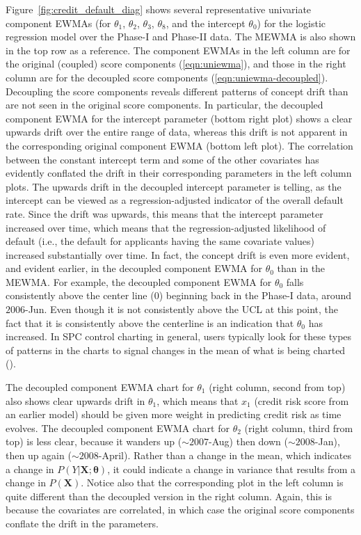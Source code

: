 \documentclass[twoside,11pt]{article}
\begin{document}
Figure~\ref{fig:credit_default_diag} shows several representative univariate component EWMAs (for $\theta_1$, $\theta_2$, $\theta_3$, $\theta_8$, and the intercept $\theta_0$) for the logistic regression model over the Phase-I and Phase-II data. The MEWMA is also shown in the top row as a reference. The component EWMAs in the left column are for the original (coupled) score components (\ref{eqn:uniewma}), and those in the right column are for the decoupled score components (\ref{eqn:uniewma-decoupled}). Decoupling the score components reveals different patterns of concept drift than are not seen in the original score components. In particular, the decoupled component EWMA for the intercept parameter (bottom right plot) shows a clear upwards drift over the entire range of data, whereas this drift is not apparent in the corresponding original component EWMA (bottom left plot). The correlation between the constant intercept term and some of the other covariates has evidently conflated the drift in their corresponding parameters in the left column plots. The upwards drift in the decoupled intercept parameter is telling, as the intercept can be viewed as a regression-adjusted indicator of the overall default rate. Since the drift was upwards, this means that the intercept parameter increased over time, which means that the regression-adjusted likelihood of default (i.e., the default for applicants having the same covariate values) increased substantially over time. In fact, the concept drift is even more evident, and evident earlier, in the decoupled component EWMA for $\theta_0$ than in the MEWMA. For example, the decoupled component EWMA for $\theta_0$ falls consistently above the center line ($0$) beginning back in the Phase-I data, around $2006$-Jun. Even though it is not consistently above the UCL at this point, the fact that it is consistently above the centerline is an indication that $\theta_0$ has increased. In SPC control charting in general, users typically look for these types of patterns in the charts to signal changes in the mean of what is being charted (\cite{montgomery2007introduction}). 

The decoupled component EWMA chart for $\theta_1$ (right column, second from top) also shows clear upwards drift in $\theta_1$, which means that $x_1$ (credit risk score from an earlier model) should be given more weight in predicting credit risk as time evolves. The decoupled component EWMA chart for $\theta_2$ (right column, third from top) is less clear, because it wanders up ($\sim 2007$-Aug) then down ($\sim 2008$-Jan), then up again ($\sim 2008$-April). Rather than a change in the mean, which indicates a change in $P(Y|\bm{X};\bm{\theta})$, it could indicate a change in variance that results from a change in $P(\bm{X})$. Notice also that the corresponding plot in the left column is quite different than the decoupled version in the right column. Again, this is because the covariates are correlated, in which case the original score components conflate the drift in the parameters.  
\end{document}
